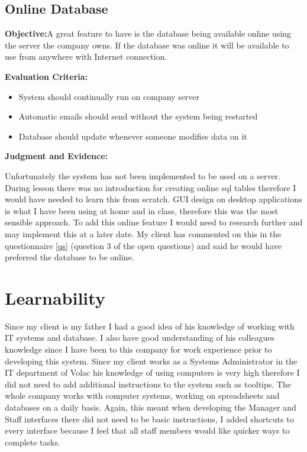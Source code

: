 \subsection{Online Database}

\textbf{Objective:}A great feature to have is the database being available online using the server the company owns. If the database was online it will be available to use from anywhere with Internet connection.

\textbf{Evaluation Criteria:}
\begin{itemize}
\item{System should continually run on company server}
\item{Automatic emails should send without the system being restarted}
\item{Database should update whenever someone modifies data on it}
\end{itemize}

\textbf{Judgment and Evidence:}

Unfortunately the system has not been implemented to be used on a server.  During lesson there was no introduction for creating online sql tables therefore I would have needed to learn this from scratch. GUI design on desktop applications is what I have been using at home and in class, therefore this was the most sensible approach. To add this online feature I would need to research further and may implement this at a later date. My client has commented on this in the questionnaire \ref{qs} (question 3 of the open questions) and said he would have preferred the database to be online.

\section{Learnability}

Since my client is my father I had a good idea of his knowledge of working with IT systems and database. I also have good understanding of his colleagues knowledge since I have been to this company for work experience prior to developing this system. Since my client works as a Systems Administrator in the IT department of Volac his knowledge of using computers is very high therefore I did not need to add additional instructions to the system such as tooltips. The whole company works with computer systems, working on spreadsheets and databases on a daily basis. Again, this meant when developing the Manager and Staff interfaces there did not need to be basic instructions, I added shortcuts to every interface because I feel that all staff members would like quicker ways to complete tasks.

